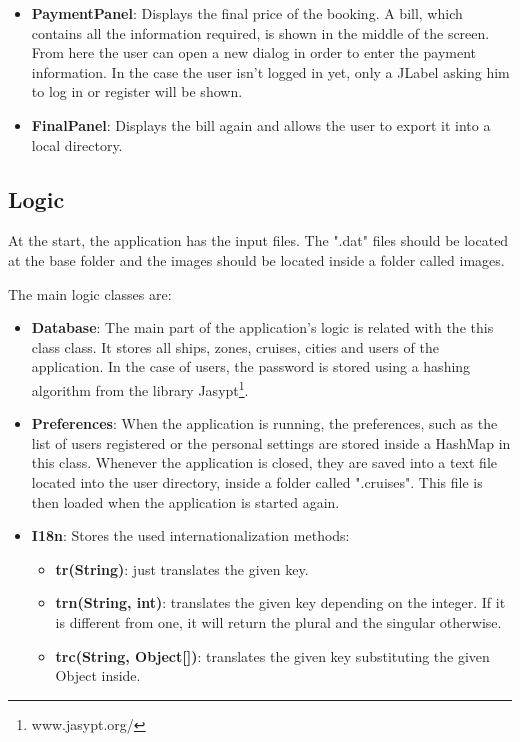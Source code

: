 \documentclass[12pt]{article}
\begin{document}
\begin{itemize}
   	    \begin{figure}
   	    \end{figure}
   	    \item \textbf{PaymentPanel}: Displays the final price of the booking. A bill, which contains all the information required, is shown in the middle of the screen. From here the user can open a new dialog in order to enter the payment information. In the case the user isn't logged in yet, only a JLabel asking him to log in or register will be shown.
   	    \begin{figure}
   	    \end{figure}
   	    \item \textbf{FinalPanel}: Displays the bill again and allows the user to export it into a local directory.
   	    \begin{figure}
   	    \end{figure}
   \end{itemize}   
   
   \subsection{Logic}
   At the start, the application has the input files. The ".dat" files should be located at the base folder and the images should be located inside a folder called images.
   
   The main logic classes are:
   \begin{itemize}
	   	\item \textbf{Database}: The main part of the application's logic is related with the this class class. It stores all ships, zones, cruises, cities and users of the application. In the case of users, the password is stored using a hashing algorithm from the library Jasypt\footnote{www.jasypt.org/}.
	   	\item \textbf{Preferences}: When the application is running, the preferences, such as the list of users registered or the personal settings are stored inside a HashMap in this class. Whenever the application is closed, they are saved into a text file located into the user directory, inside a folder called ".cruises". This file is then loaded when the application is started again.
	   	\item \textbf{I18n}: Stores the used internationalization methods:
		\begin{itemize}
			\item \textbf{tr(String)}: just translates the given key.
			\item \textbf{trn(String, int)}: translates the given key depending on the integer. If it is different from one, it will return the plural and the singular otherwise.
			\item \textbf{trc(String, Object[])}: translates the given key substituting the given Object inside.
		\end{itemize}
   \end{itemize}
\end{document}
